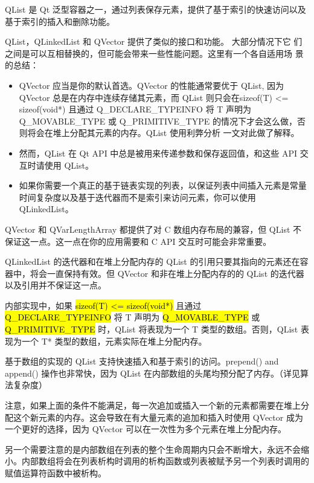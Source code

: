 QList 是 Qt 泛型容器之一，通过列表保存元素，提供了基于索引的快速访问以及基于索引的插入和删除功能。

QList，QLinkedList 和 QVector 提供了类似的接口和功能。 大部分情况下它
们之间是可以互相替换的，但可能会带来一些性能问题。这里有一个各自适用场
景的总结：

\begin{itemize}

\item QVector 应当是你的默认首选。QVector 的性能通常要优于 QList, 因为 QVector 总是在内存中连续存储其元素，而 QList 则只会在sizeof(T) <= sizeof(void*) 且通过 Q\_DECLARE\_TYPEINFO 将 T 声明为 Q\_MOVABLE\_TYPE 或 Q\_PRIMITIVE\_TYPE 的情况下才会这么做，否则将会在堆上分配其元素的内存。QList 使用利弊分析 一文对此做了解释。
\item    然而，QList 在 Qt API 中总是被用来传递参数和保存返回值，和这些 API 交互时请使用 QList。
\item    如果你需要一个真正的基于链表实现的列表，以保证列表中间插入元素是常量时间复杂度以及基于迭代器而不是索引来访问元素，你可以使用 QLinkedList。

\end{itemize}

\begin{notice}
QVector 和 QVarLengthArray 都提供了对 C 数组内存布局的兼容，但 QList 不保证这一点。这一点在你的应用需要和 C API 交互时可能会非常重要。
\end{notice}

\begin{notice}
QLinkedList 的迭代器和在堆上分配内存的 QList 的引用只要其指向的元素还在容器中，将会一直保持有效。但 QVector 和非在堆上分配内存的的 QList 的迭代器以及引用并不保证这一点。
\end{notice}

内部实现中，如果 \hl{sizeof(T) <= sizeof(void*)} 且通过 \hl{Q\_DECLARE\_TYPEINFO} 将 T 声明为 \hl{Q\_MOVABLE\_TYPE} 或 \hl{Q\_PRIMITIVE\_TYPE} 时，QList 将表现为一个 T 类型的数组。否则，QList 表现为一个 T* 类型的数组，元素实际在堆上分配内存。

基于数组的实现的 QList 支持快速插入和基于索引的访问。prepend() and append() 操作也非常快，因为 QList 在内部数组的头尾均预分配了内存。（详见算法复杂度）

注意，如果上面的条件不能满足，每一次追加或插入一个新的元素都需要在堆上分配这个新元素的内存。这会导致在有大量元素的追加和插入时使用 QVector 成为一个更好的选择，因为 QVector 可以在一次性为多个元素在堆上分配内存。

另一个需要注意的是内部数组在列表的整个生命周期内只会不断增大，永远不会缩小。内部数组将会在列表析构时调用的析构函数或列表被赋予另一个列表时调用的赋值运算符函数中被析构。

